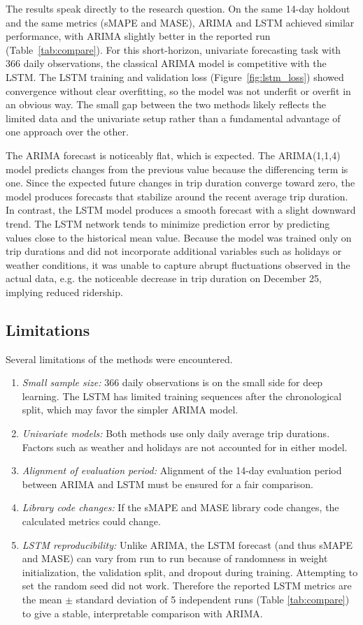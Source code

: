 \documentclass[12pt, a4paper]{article}
\begin{document}
The results speak directly to the research question. On the same 14-day holdout and the same metrics (sMAPE and MASE), ARIMA and LSTM achieved similar performance, with ARIMA slightly better in the reported run (Table~\ref{tab:compare}). For this short-horizon, univariate forecasting task with 366 daily observations, the classical ARIMA model is competitive with the LSTM. The LSTM training and validation loss (Figure~\ref{fig:lstm_loss}) showed convergence without clear overfitting, so the model was not underfit or overfit in an obvious way. The small gap between the two methods likely reflects the limited data and the univariate setup rather than a fundamental advantage of one approach over the other.

The ARIMA forecast is noticeably flat, which is expected. The ARIMA(1,1,4) model predicts changes from the previous value because the differencing term is one. Since the expected future changes in trip duration converge toward zero, the model produces forecasts that stabilize around the recent average trip duration. In contrast, the LSTM model produces a smooth forecast with a slight downward trend. The LSTM network tends to minimize prediction error by predicting values close to the historical mean value. Because the model was trained only on trip durations and did not incorporate additional variables such as holidays or weather conditions, it was unable to capture abrupt fluctuations observed in the actual data, e.g. the noticeable decrease in trip duration on December 25, implying reduced ridership.

\subsection{Limitations}

Several limitations of the methods were encountered.

\begin{enumerate}
    \item \textit{Small sample size:} 366 daily observations is on the small side for deep learning. The LSTM has limited training sequences after the chronological split, which may favor the simpler ARIMA model.
    \item \textit{Univariate models:} Both methods use only daily average trip durations. Factors such as weather and holidays are not accounted for in either model. 
    \item \textit{Alignment of evaluation period:}  Alignment of the 14-day evaluation period between ARIMA and LSTM must be ensured for a fair comparison.
    \item \textit{Library code changes:} If the sMAPE and MASE library code changes, the calculated metrics could change.
    \item \textit{LSTM reproducibility:} Unlike ARIMA, the LSTM forecast (and thus sMAPE and MASE) can vary from run to run because of randomness in weight initialization, the validation split, and dropout during training. Attempting to set the random seed did not work. Therefore the reported LSTM metrics are the mean $\pm$ standard deviation of 5 independent runs (Table \ref{tab:compare}) to give a stable, interpretable comparison with ARIMA.
\end{enumerate}
\end{document}
